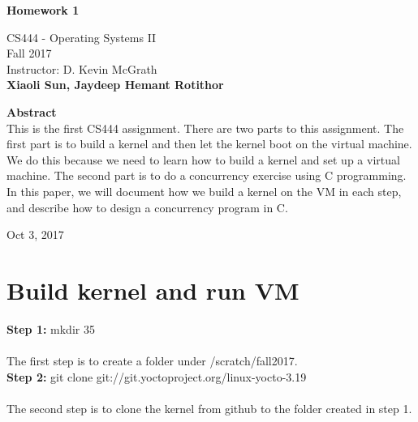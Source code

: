 \documentclass[10pt,letterpaper,titlepage]{article}
\begin{document}
\begin{titlepage}
\begin{center}
    \Huge
    \textbf{Homework 1}
    
    \vspace{1in}
    \large
    CS444 - Operating Systems II\\
    
    \vspace{0.2in}
    \large
    Fall 2017\\
    
    \vspace{0.2in}
    \large
    Instructor: D. Kevin McGrath\\
    
    \vspace{0.2in}
    \textbf{Xiaoli Sun, Jaydeep Hemant Rotithor}
    
    \vspace{0.5in}
    \textbf{Abstract}\\
    \vspace{0.2in}
    This is the first CS444 assignment. There are two parts to this assignment. The first part is to build a kernel and then let the kernel boot on the virtual machine. We do this because we need to learn how to build a kernel and set up a virtual machine. The second part is to do a concurrency exercise using C programming. In this paper, we will document how we build a kernel on the VM in each step, and describe how to design a concurrency program in C. 
    
    \vspace{0.3in}
    \vfill
    
    Oct 3, 2017

\end{center}
\end{titlepage}




\newpage
\section{Build kernel and run VM}

\textbf{}

\textbf{Step 1:}
mkdir 35\\ \\
The first step is to create a folder under /scratch/fall2017.\\


\textbf{Step 2:}
git clone git://git.yoctoproject.org/linux-yocto-3.19 \\ \\
The second step is to clone the kernel from github to the folder created in step 1.\\
\end{document}

